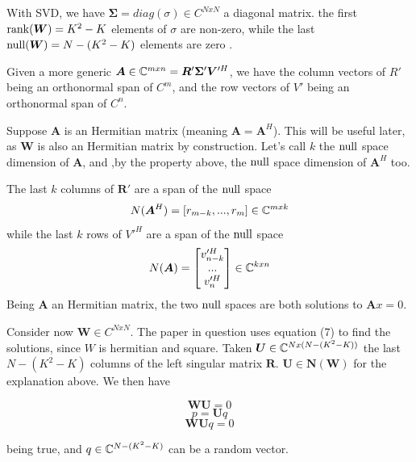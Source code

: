 With SVD, we have $\bm{\Sigma} = diag(\sigma) \in C^{NxN}$ a diagonal matrix. the first $\operatorname{rank}(\bm{W}) = K^2-K$ elements of $\sigma$ are non-zero, while the last $\operatorname{null}(\bm{W}) = N - (K^2-K)$ elements are zero \cite{svd}.

Given a more generic $\bm{A} \in \mathbb{C}^{mxn} = \bm{R}'\bm{ \Sigma}' \bm{V}'^H$, we have the column vectors of $R'$ being an orthonormal span of $C^m$, and the row vectors of $V'$ being an orthonormal span of $C^n$.

Suppose $\bm{A}$ is an Hermitian matrix (meaning $\bm{A} = \bm{A}^H$). This will be useful later, as $\bm{W}$ is also an Hermitian matrix by construction. Let's call $k$ the $\operatorname{null}$ space dimension of $\bm{A}$, and ,by the property above, the $\operatorname{null}$ space dimension of $\bm{A}^H$ too.

The last $k$ columns of $\bm{R}'$ are a span of the $\operatorname{null}$ space
\begin{equation}
  N(\bm{A}^H) = [r_{m-k}, ..., r_m ] \in \mathbb{C}^{mxk}
\end{equation}
while the last $k$ rows of $V'^H$ are a span of the $\operatorname{null}$ space
\begin{equation}
  N(\bm{A}) = \begin{bmatrix} v'^H_{n-k} \\ ... \\ v'^H_n \end{bmatrix} \in \mathbb{C}^{kxn}
\end{equation}
Being $\bm{A}$ an Hermitian matrix, the two $\operatorname{null}$ spaces are both solutions to $\bm{A}x = 0$.

Consider now $\bm{W} \in C^{NxN}$. The paper in question uses equation (7) to find the solutions, since $W$ is hermitian and square. Taken $\bm{U} \in \mathbb{C} ^ {Nx(N-(K^2 - K))}$ the last $N-(K^2 - K)$ columns of the left singular matrix $\bm{R}$. $\bm{U} \in \bm{N}(\bm{W})$ for the explanation above. We then have

\begin{equation}\bm{WU} = 0\end{equation}
\begin{equation}p = \bm{U}q\end{equation}
\begin{equation}\bm{WU}q = 0\end{equation}

being true, and $q \in \mathbb{C}^{N-(K^2 - K)}$ can be a random vector.
